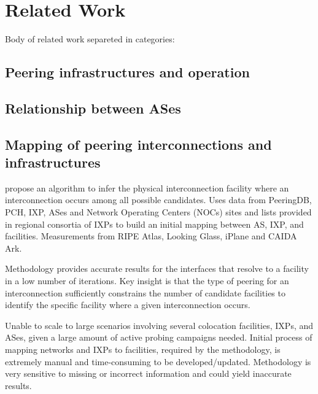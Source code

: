 \chapter{Related Work}\label{cap:related-work}
\thispagestyle{empty}

	Body of related work separeted in categories:

	\section{Peering infrastructures and operation}
	\label{sec:rel-work-peering-infra}

	\cite{Ager:2012, Richter:2014, Chatzis:2013:BUL:2504730.2504746, DissectingBrazilianIXP}

	\section{Relationship between ASes}
	\label{sec:rel-work-relat-as}

	\cite{Giotsas:2014:ICR:2663716.2663743, Giotsas:2015:MPI:2716281.2836122, Luckie:2013:RCC:2504730.2504735}

	\section{Mapping of peering interconnections and infrastructures}
	\label{sec:rel-work-mapping-peer}

	\cite{Augustin:2009:IM:1644893.1644934, nomikos2016traixroute}

	\cite{Giotsas:2015:MPI:2716281.2836122} propose an algorithm to infer the physical interconnection facility where an interconnection occurs among all possible candidates. Uses data from PeeringDB, PCH, IXP, ASes and Network Operating Centers (NOCs) sites and lists provided in regional consortia of IXPs to build an initial mapping between AS, IXP, and facilities.
	Measurements from RIPE Atlas, Looking Glass, iPlane and CAIDA Ark.
	
	Methodology provides accurate results for the interfaces that resolve to a facility in a low number of iterations. Key insight is that the type of peering for an interconnection sufficiently constrains the number of candidate facilities to identify the specific facility where a given interconnection occurs.
	
	Unable to scale to large scenarios involving several colocation facilities, IXPs, and ASes, given a large amount of active probing campaigns needed. Initial process of mapping networks and IXPs to facilities, required by the methodology, is extremely manual and time-consuming to be developed/updated. Methodology is very sensitive to missing or incorrect information and could yield inaccurate results. 


